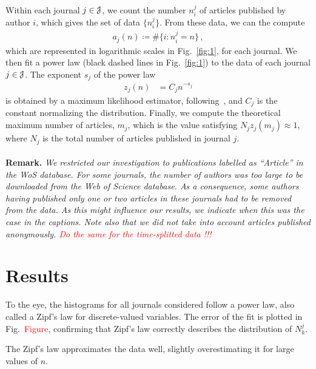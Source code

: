 \documentclass[9pt,twocolumn,twoside]{pnas-new}
\begin{document}
\paragraph{}
Within each journal $j\in {\cal J}$, we count the number $n^j_i$ of articles published by author $i$, which gives the set of data $\{n^j_i\}$. 
From these data, we can the compute 
\begin{align}
 a_j(n)\coloneqq\#\{i\colon n^j_i = n\}\, ,
\end{align}
which are represented in logarithmic scales in Fig.~\ref{fig:1}, for each journal. 
We then fit a power law (black dashed lines in Fig.~\ref{fig:1}) to the data of each journal $j\in{\cal J}$. 
The exponent $s_j$ of the power law 
\begin{align}
 z_j(n) &= C_jn^{-s_j}
\end{align}
is obtained by a maximum likelihood estimator, following~\cite{Cla09}, and $C_j$ is the constant normalizing the distribution. 
Finally, we compute the theoretical maximum number of articles, $m_j$, which is the value satisfying $N_jz_j(m_j)\approx1$, where $N_j$ is the total number of articles published in journal $j$. 

\paragraph{}
{\bf Remark.}\textit{
 We restricted our investigation to publications labelled as ``Article'' in the WoS database.
 For some journals, the number of authors was too large to be downloaded from the Web of Science database. 
 As a consequence, some authors having published only one or two articles in these journals had to be removed from the data. 
 As this might influence our results, we indicate when this was the case in the captions. 
 Note also that we did not take into account articles published anonymously. 
 \textcolor{red}{Do the same for the time-splitted data !!!}
}

\section{Results}
To the eye, the histograms for all journals considered follow a power law, also called a Zipf's law for discrete-valued variables. 
The error of the fit is plotted in Fig.~\textcolor{red}{Figure}, confirming that Zipf's law correctly describes the distribution of $N^j_k$. 

The Zipf's law  approximates the data well, slightly overestimating it for large values of $n$. 
\end{document}
